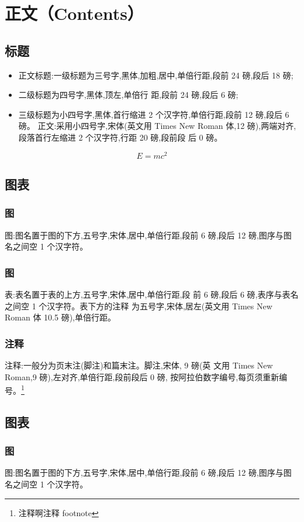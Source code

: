 \documentclass{LZU}
\begin{document}
\section{正文（Contents）}
\subsection{标题}
\begin{itemize}
    \item 正文标题:一级标题为三号字,黑体,加粗,居中,单倍行距,段前 24 磅,段后 18 磅;
    \item 二级标题为四号字,黑体,顶左,单倍行 距,段前 24 磅,段后 6 磅;
    \item 三级标题为小四号字,黑体,首行缩进 2 个汉字符,单倍行距,段前 12 磅,段后 6 磅。 正文:采用小四号字,宋体(英文用 Times New Roman 体,12 磅),两端对齐,段落首行左缩进 2 个汉字符,行距 20 磅,段前段 后 0 磅。
\end{itemize}
\begin{equation}
    E=mc^2
\end{equation}

\subsection{图表}
\subsubsection{图}
图:图名置于图的下方,五号字,宋体,居中,单倍行距,段前 6 磅,段后 12 磅,图序与图名之间空 1 个汉字符。
\subsubsection{图}
表:表名置于表的上方,五号字,宋体,居中,单倍行距,段 前 6 磅,段后 6 磅,表序与表名之间空 1 个汉字符。表下方的注释 为五号字,宋体,居左(英文用 Times New Roman 体 10.5 磅),单倍行距。
\subsubsection{注释}
注释:一般分为页末注(脚注)和篇末注。脚注,宋体, 9 磅(英 文用 Times New Roman,9 磅),左对齐,单倍行距,段前段后 0 磅, 按阿拉伯数字编号,每页须重新编号。\footnote{注释啊注释 footnote}
\subsection{图表}
\subsubsection{图}
图:图名置于图的下方,五号字,宋体,居中,单倍行距,段前 6 磅,段后 12 磅,图序与图名之间空 1 个汉字符。
\end{document}
